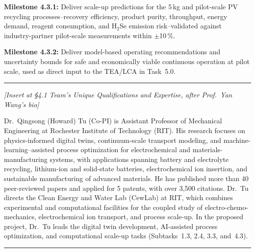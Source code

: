\documentclass[11pt]{article}
\begin{document}
\noindent\textbf{Milestone 4.3.1:} Deliver scale-up predictions for the
5\,kg and pilot-scale PV recycling processes--recovery efficiency,
product purity, throughput, energy demand, reagent consumption, and
H$_2$Se emission risk--validated against industry-partner pilot-scale
measurements within $\pm$10\,\%.\par

\noindent\textbf{Milestone 4.3.2:} Deliver model-based operating
recommendations and uncertainty bounds for safe and economically viable
continuous operation at pilot scale, used as direct input to the TEA/LCA
in Task~5.0.

\vspace{1em}\noindent\rule{0.4\textwidth}{0.4pt}\vspace{0.6em}


\noindent\textit{[Insert at \S4.1 Team's Unique Qualifications and Expertise, after Prof.\ Yan Wang's bio]}\par

\noindent Dr.\ Qingsong (Howard) Tu (Co-PI) is Assistant Professor of
Mechanical Engineering at Rochester Institute of Technology (RIT). His
research focuses on physics-informed digital twins, continuum-scale
transport modeling, and machine-learning--assisted process optimization
for electrochemical and materials-manufacturing systems, with
applications spanning battery and electrolyte recycling, lithium-ion
and solid-state batteries, electrochemical ion insertion, and
sustainable manufacturing of advanced materials. He has published more
than 40 peer-reviewed papers and applied for 5 patents, with over
3,500 citations. Dr.\ Tu directs the Clean Energy and Water Lab
(CewLab) at RIT, which combines experimental and computational
facilities for the coupled study of electro-chemo-mechanics,
electrochemical ion transport, and process scale-up. In the proposed
project, Dr.\ Tu leads the digital twin development, AI-assisted
process optimization, and computational scale-up tasks
(Subtasks~1.3, 2.4, 3.3, and~4.3).

\vspace{1em}\noindent\rule{0.4\textwidth}{0.4pt}\vspace{0.6em}

\end{document}
